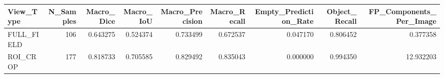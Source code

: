 \begin{tabular}{lrrrrrrrr}
\toprule
View_Type & N_Samples & Macro_Dice & Macro_IoU & Macro_Precision & Macro_Recall & Empty_Prediction_Rate & Object_Recall & FP_Components_Per_Image \\
\midrule
FULL_FIELD & 106 & 0.643275 & 0.524374 & 0.733499 & 0.672537 & 0.047170 & 0.806452 & 0.377358 \\
ROI_CROP & 177 & 0.818733 & 0.705585 & 0.829492 & 0.835043 & 0.000000 & 0.994350 & 12.932203 \\
\bottomrule
\end{tabular}
